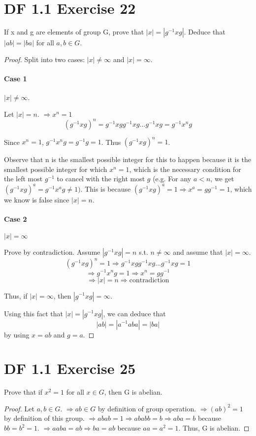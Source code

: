 \documentclass{article}
\begin{document}
\section{DF 1.1 Exercise 22}
If x and g are elements of group G, prove that $|x| = |g^{-1}xg|$. Deduce that $|ab|=|ba|$ for all $ a, b \in G$.
\begin{proof}
Split into two cases: $|x| \neq \infty$ and $|x| = \infty$.
\paragraph{Case 1} $|x| \neq \infty$.

Let $|x|=n$. $\Rightarrow x^n = 1$
\[
(g^{-1}xg)^n = g^{-1}xg g^{-1}xg ... g^{-1}xg = g^{-1}x^ng
\]

Since $x^n = 1$, $g^{-1}x^n g = g^{-1}g = 1$.
Thus $(g^{-1}x g)^n = 1$.

Observe that n is the smallest possible integer for this to happen because it is the smallest possible integer for which $x^n = 1$, which is the necessary condition for the left most $g^{-1}$ to cancel with the right most $g$ (e.g. For any $a<n$, we get $(g^{-1}x g)^a = g^{-1}x^a g \neq 1)$. This is because $(g^{-1}x g)^a = 1 \Rightarrow x^a = g g^{-1} = 1$, which we know is false since $|x| = n$.

\paragraph{Case 2} $|x| = \infty$

Prove by contradiction. Assume $|g^{-1}x g| = n$ s.t. $n \neq \infty$ and assume that $|x| = \infty$.
\[
(g^{-1}x g)^n = 1 \Rightarrow g^{-1}x g g^{-1}x g ... g^{-1}x g = 1
\]
\[
\Rightarrow g^{-1}x^n g = 1 \Rightarrow x^n = g g^{-1}
\]
\[
\Rightarrow |x|=n \Rightarrow \textrm{contradiction}
\]

Thus, if $|x|=\infty$, then $|g^{-1}x g| = \infty$.

Using this fact that $|x|=|g^{-1}x g|$, we can deduce that
\[
|ab| = |a^{-1}aba| =|ba|
\]
by using $x=ab$ and $g=a$.

\end{proof}

\section{DF 1.1 Exercise 25}
Prove that if $x^2=1$ for all $x \in G$, then G is abelian.
\begin{proof}
Let $a, b \in G$. $\Rightarrow ab \in G$ by definition of group operation. $\Rightarrow (ab)^2 = 1$ by definition of this group. $\Rightarrow abab=1 \Rightarrow ababb=b \Rightarrow aba= b$ because $bb=b^2=1$. $\Rightarrow aaba=ab \Rightarrow ba = ab$ because $aa=a^2=1$. Thus, G is abelian.
\end{proof}
\end{document}
